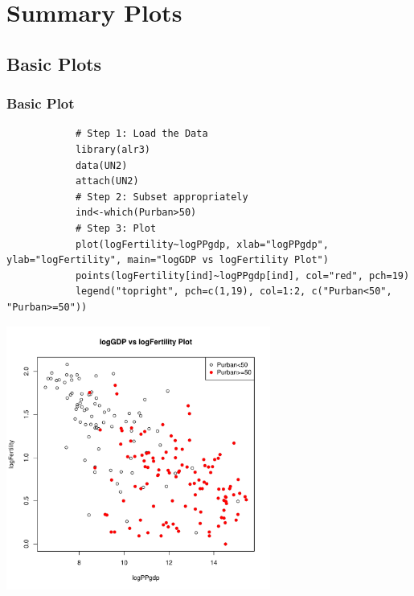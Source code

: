 

\section[Summary Plots]{Summary Plots}

\subsection{Basic Plots}
\begin{frame}
  \frametitle{Basic Plot}
      
      		\begin{lstlisting}
			# Step 1: Load the Data
			library(alr3)
			data(UN2)
			attach(UN2)
			# Step 2: Subset appropriately
			ind<-which(Purban>50)
			# Step 3: Plot		
			plot(logFertility~logPPgdp, xlab="logPPgdp", ylab="logFertility", main="logGDP vs logFertility Plot")
			points(logFertility[ind]~logPPgdp[ind], col="red", pch=19)
			legend("topright", pch=c(1,19), col=1:2, c("Purban<50", "Purban>=50"))
		\end{lstlisting}
%
\newpage
       \begin{center}
         \includegraphics[width=0.65\textwidth]{images/Unplot3.pdf}
        \end{center}


\end{frame}

